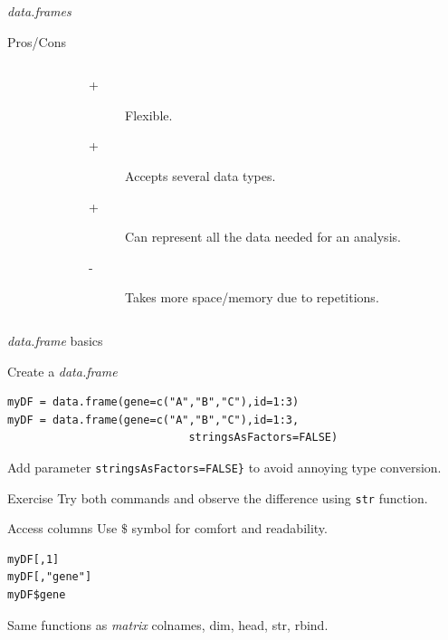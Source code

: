 \documentclass[10pt]{beamer}
\newcommand{\df}{{\it data.frame} }
\newcommand{\dfs}{{\it data.frames} }
\newcommand{\mat}{{\it matrix} }
\begin{document}
\begin{frame}[fragile, shrink=19]{\dfs}
\begin{block}{Pros/Cons}
\begin{columns}
\begin{column}{.5\textwidth}
      \end{column}
      \begin{column}{.5\textwidth}
        \begin{description}
        \item[+] Flexible.
        \item[+] Accepts several data types.
        \item[+] Can represent all the data needed for an analysis.
        \item[-] Takes more space/memory due to repetitions.
        \end{description}
      \end{column}
    \end{columns}
  \end{block}
\end{frame}

\begin{frame}[fragile,shrink=15]{\df basics}
  \begin{exampleblock}{Create a \df}
\begin{verbatim}
myDF = data.frame(gene=c("A","B","C"),id=1:3)
myDF = data.frame(gene=c("A","B","C"),id=1:3, 
                            stringsAsFactors=FALSE)
\end{verbatim}
Add parameter \verb!stringsAsFactors=FALSE}! to avoid annoying type conversion.
  \end{exampleblock}
  \begin{alertblock}{Exercise}
    Try both commands and observe the difference using \verb!str! function.
  \end{alertblock}
  \begin{exampleblock}{Access columns}
    Use $\$$ symbol for comfort and readability.
\begin{verbatim}
myDF[,1]
myDF[,"gene"]
myDF$gene
\end{verbatim}
  \end{exampleblock}
  \begin{block}{Same functions as \mat}
    {\sf colnames}, {\sf dim}, {\sf head}, {\sf str}, {\sf rbind}.
  \end{block}
\end{frame}
\end{document}
